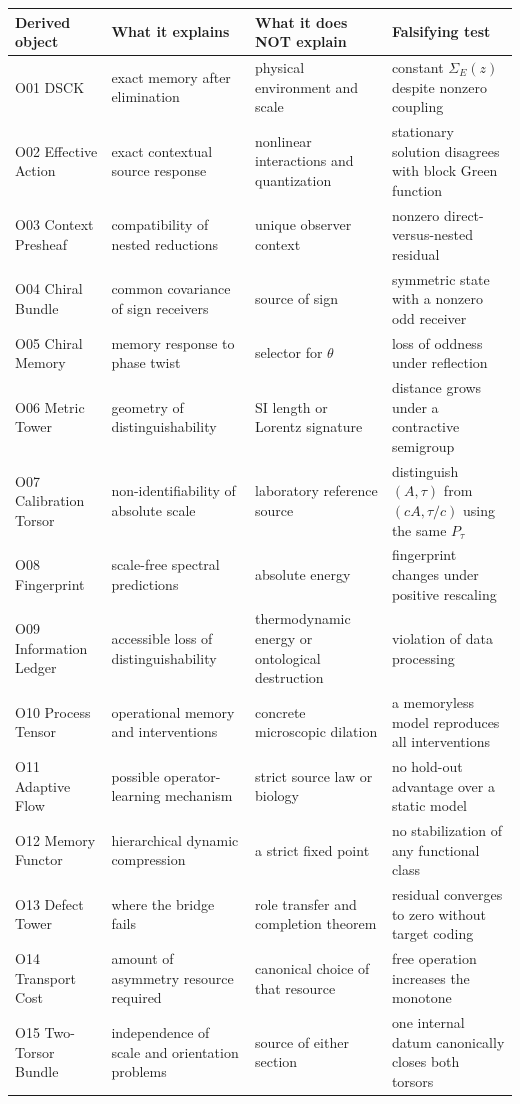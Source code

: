 \documentclass[11pt,a4paper,openany]{report}
\begin{document}
\begin{center}
\begingroup\small
\setlength{\tabcolsep}{2.5pt}
\renewcommand{\arraystretch}{1.16}
\begin{longtable}{@{}p{}p{}p{}p{}@{}}
\toprule
\textbf{Derived object} & \textbf{What it explains} & \textbf{What it does NOT explain} & \textbf{Falsifying test} \\
\midrule
\endhead
O01 DSCK & exact memory after elimination & physical environment and scale & constant \(\Sigma_E(z)\) despite nonzero coupling \\
O02 Effective Action & exact contextual source response & nonlinear interactions and quantization & stationary solution disagrees with block Green function \\
O03 Context Presheaf & compatibility of nested reductions & unique observer context & nonzero direct-versus-nested residual \\
O04 Chiral Bundle & common covariance of sign receivers & source of sign & symmetric state with a nonzero odd receiver \\
O05 Chiral Memory & memory response to phase twist & selector for \(\theta\) & loss of oddness under reflection \\
O06 Metric Tower & geometry of distinguishability & SI length or Lorentz signature & distance grows under a contractive semigroup \\
O07 Calibration Torsor & non-identifiability of absolute scale & laboratory reference source & distinguish \((A,\tau)\) from \((cA,\tau/c)\) using the same \(P_\tau\) \\
O08 Fingerprint & scale-free spectral predictions & absolute energy & fingerprint changes under positive rescaling \\
O09 Information Ledger & accessible loss of distinguishability & thermodynamic energy or ontological destruction & violation of data processing \\
O10 Process Tensor & operational memory and interventions & concrete microscopic dilation & a memoryless model reproduces all interventions \\
O11 Adaptive Flow & possible operator-learning mechanism & strict source law or biology & no hold-out advantage over a static model \\
O12 Memory Functor & hierarchical dynamic compression & a strict fixed point & no stabilization of any functional class \\
O13 Defect Tower & where the bridge fails & role transfer and completion theorem & residual converges to zero without target coding \\
O14 Transport Cost & amount of asymmetry resource required & canonical choice of that resource & free operation increases the monotone \\
O15 Two-Torsor Bundle & independence of scale and orientation problems & source of either section & one internal datum canonically closes both torsors \\
\bottomrule
\end{longtable}
\endgroup
\end{center}
\end{document}
